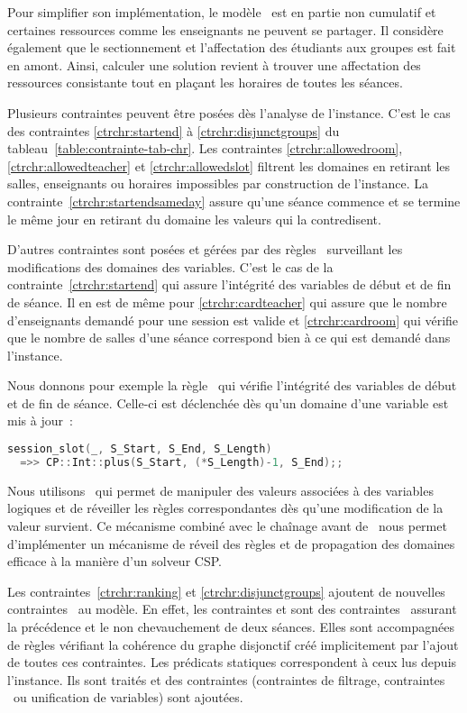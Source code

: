 Pour simplifier son implémentation, le modèle \CHR\ est en partie non cumulatif et certaines ressources comme les enseignants ne peuvent se partager. Il considère également que le sectionnement et l'affectation des étudiants aux groupes est fait en amont. Ainsi, calculer une solution revient à trouver une affectation des ressources consistante tout en plaçant les horaires de toutes les séances.

Plusieurs contraintes peuvent être posées dès l'analyse de l'instance. C'est le cas des contraintes \ref{ctrchr:startend} à \ref{ctrchr:disjunctgroups} du tableau~\ref{table:contrainte-tab-chr}. Les contraintes \ref{ctrchr:allowedroom}, \ref{ctrchr:allowedteacher} et \ref{ctrchr:allowedslot} filtrent les domaines en retirant les salles, enseignants ou horaires impossibles par construction de l'instance. La contrainte~\ref{ctrchr:startendsameday} assure qu'une séance commence et se termine le même jour en retirant du domaine les valeurs qui la contredisent.

D'autres contraintes sont posées et gérées par des règles \CHR\ surveillant les modifications des domaines des variables. C'est le cas de la contrainte~\ref{ctrchr:startend} qui assure l'intégrité des variables de début et de fin de séance. Il en est de même pour \ref{ctrchr:cardteacher} qui assure que le nombre d'enseignants demandé pour une session est valide et \ref{ctrchr:cardroom} qui vérifie que le nombre de salles d'une séance correspond bien à ce qui est demandé dans l'instance.

Nous donnons pour exemple la règle \CHRPP\ qui vérifie l'intégrité des variables de début et de fin de séance. Celle-ci est déclenchée dès qu'un domaine d'une variable est mis à jour~:

\begin{lstlisting}[style=custom, language=c++]
session_slot(_, S_Start, S_End, S_Length)
  =>> CP::Int::plus(S_Start, (*S_Length)-1, S_End);;
\end{lstlisting}

Nous utilisons \CHRPP\ qui permet de manipuler des valeurs associées à des variables logiques et de réveiller les règles correspondantes dès qu'une modification de la valeur survient. Ce mécanisme combiné avec le chaînage avant de \CHR\ nous permet d'implémenter un mécanisme de réveil des règles et de propagation des domaines efficace à la manière d'un solveur CSP.

Les contraintes~\ref{ctrchr:ranking} et \ref{ctrchr:disjunctgroups} ajoutent de nouvelles contraintes \CHR\ au modèle. En effet, les contraintes  et  sont des contraintes \CHR\ assurant la précédence et le non chevauchement de deux séances. Elles sont accompagnées de règles vérifiant la cohérence du graphe disjonctif créé implicitement par l'ajout de toutes ces contraintes. Les prédicats statiques correspondent à ceux lus depuis l'instance. Ils sont traités et des contraintes (contraintes de filtrage, contraintes \CHR\ ou unification de variables) sont ajoutées. 

